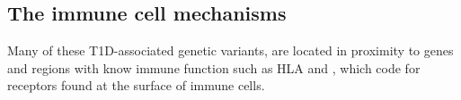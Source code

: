 


\subsection{The immune cell mechanisms}

Many of these T1D-associated genetic variants, are located in proximity to genes and regions with know immune function such as HLA and ,
which code for receptors found at the surface of immune cells.

